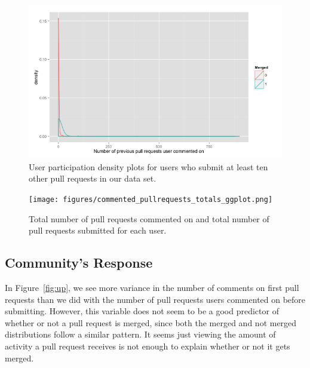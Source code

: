 \documentclass{sigchi}
\begin{document}
\begin{figure}[p] \centering
\includegraphics[scale=0.6]{figures/number_comments_density_repeaters_10_ggplot.png}
\caption{User participation density plots for users who submit at least ten
other pull requests in our data set.}
\label{fig:repeaters_10} \end{figure}

\begin{figure}[p] \centering
\texttt{[image: figures/commented\_pullrequests\_totals\_ggplot.png]}
\caption{Total number of pull requests commented on and total number of pull
requests submitted for each user.} \label{fig:commented_pullrequests_totals}
\end{figure}

\subsection{Community's Response}
In Figure~\ref{fig:up}, we see more variance in the number of comments on
first pull requests than we did with the number of pull requests users commented
on before submitting. However, this variable does not seem to be a good
predictor of whether or not a pull request is merged, since both the merged and
not merged distributions follow a similar pattern. It seems just viewing the
amount of activity a pull request receives is not enough to explain whether or
not it gets merged.
\end{document}
